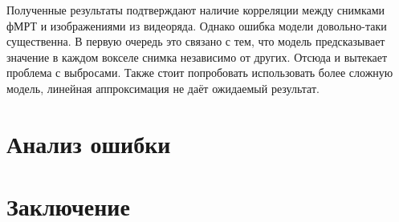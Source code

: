 \documentclass[12pt,twoside]{article}
\begin{document}
Полученные результаты подтверждают наличие корреляции между снимками фМРТ и изображениями из видеоряда. 
Однако ошибка модели довольно-таки существенна.
В первую очередь это связано с тем, что модель предсказывает значение в каждом вокселе снимка независимо от других. 
Отсюда и вытекает проблема с выбросами. 
Также стоит попробовать использовать более сложную модель, линейная аппроксимация не даёт ожидаемый результат.





\section{Анализ ошибки}

\section{Заключение}









\end{document}
